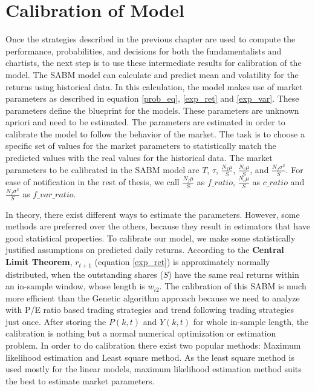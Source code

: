 \newpage
\chapter{Calibration of Model}
Once the strategies described in the previous chapter are used to compute the performance, probabilities, and decisions for both the fundamentalists and chartists, the next step is to use these intermediate results for calibration of the model. The SABM model can calculate and predict mean and volatility for the returns using historical data. In this calculation, the model makes use of market parameters as described in equation \ref{prob_eq}, \ref{exp_ret} and \ref{exp_var}. These parameters define the blueprint for the models. These parameters are unknown apriori and need to be estimated. The parameters are estimated in order to calibrate the model to follow the behavior of the market. The task is to choose a specific set of values for the market parameters to statistically match the predicted values with the real values for the historical data. The market parameters to be calibrated in the SABM model are $T$, $\tau$, $\frac{N_{f}\mu}{S}$, $\frac{N_{c}\mu}{S}$, and $\frac{N_{f}\sigma^2}{S}$. For ease of notification in the rest of thesis, we call $\frac{N_{f}\mu}{S}$ as $f\_ratio$, $\frac{N_{c}\mu}{S}$ as $c\_ratio$ and $\frac{N_{f}\sigma^2}{S}$ as $f\_var\_ratio$.

In theory, there exist different ways to estimate the parameters. However, some methods are preferred over the others, because they result in estimators that have good statistical properties. To calibrate our model, we make some statistically justified assumptions on predicted daily returns. According to the \textbf{Central Limit Theorem}, $r_{t+1}$  (equation \ref{exp_ret}) is approximately normally distributed, when the outstanding shares ($S$) have the same real returns within an in-sample window, whose length is $w_{i2}$. The calibration of this SABM is much more efficient than the Genetic algorithm approach because we need to analyze with P/E ratio based trading strategies and trend following trading strategies just once. After storing the $P(k,t)$ and $Y(k,t)$ for whole in-sample length, the calibration is nothing but a normal numerical optimization or estimation problem. In order to do calibration there exist two popular methods: Maximum likelihood estimation and Least square method.
As the least square method is used mostly for the linear models, maximum likelihood estimation method suits the best to estimate market parameters.


